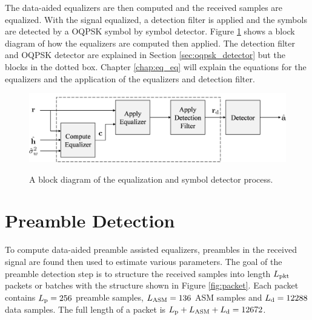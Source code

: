 The data-aided equalizers are then computed and the received samples are equalized.
With the signal equalized, a detection filter is applied and the symbols are detected by a OQPSK symbol by symbol detector.
Figure \ref{fig:ProcessingBlock} shows a block diagram of how the equalizers are computed then applied.
The detection filter and OQPSK detector are explained in Section \ref{sec:oqpsk_detector} but the blocks in the dotted box.
Chapter \ref{chap:eq_eq} will explain the equations for the equalizers and the application of the equalizers and detection filter.
\begin{figure}
	\centering\includegraphics[width=9.35in/100*55]{figures/systemOverview/ProcessingBlock.pdf}
	\label{fig:ProcessingBlock}
	\caption{A block diagram of the equalization and symbol detector process.}
\end{figure}

\section{Preamble Detection}
\label{sec:pd}
To compute data-aided preamble assisted equalizers, preambles in the received signal are found then used to estimate various parameters.
The goal of the preamble detection step is to structure the received samples into length $L_\text{pkt}$ packets or batches with the structure shown in Figure \ref{fig:packet}.
Each packet contains $L_\text{p} = 256$ preamble samples, $L_\text{ASM} = 136$ ASM samples and $L_\text{d} = 12288$ data samples.
The full length of a packet is $L_\text{p} + L_\text{ASM} + L_\text{d} = 12672$.

